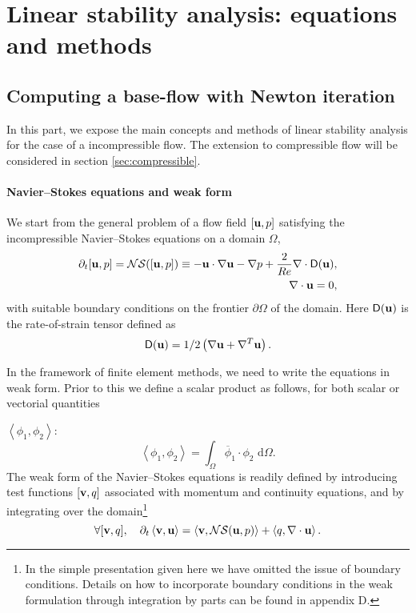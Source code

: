 \documentclass[twocolumn,10pt]{asme2ej}
\newcommand{\be}[1]{ \begin{equation} \label{#1}}
\newcommand{\ee}{\end{equation}}
\begin{document}

\section{Linear stability analysis: equations and methods}
\vspace{.2cm}


\subsection{Computing a base-flow with Newton iteration}
\vspace{.2cm}

In this part, we expose the main concepts and methods of linear stability analysis for the case of a incompressible flow.
The extension to compressible flow will be considered in section \ref{sec:compressible}.



\paragraph{Navier--Stokes equations and weak form}

We start from the general problem of a flow field $[{\bf u},p]$ satisfying the incompressible Navier--Stokes equations on a domain $\Omega$,
\begin{eqnarray} \label{NSprimitive}
\partial_t  [{\bf u},p] = {\cal NS} ( [{\bf u},p] )
\equiv - {\bf u} \cdot \nabla {\bf u} - \nabla p + \frac{2}{Re}  \nabla \cdot {\mathsf{D}}({\bf u}),  \\
\nabla \cdot {\bf u} = 0,
\end{eqnarray}
with suitable boundary conditions on the frontier $\partial \Omega$ of the domain.
Here $ {\mathsf{D}}({\bf u}) $ is the rate-of-strain tensor defined as
$$
 {\mathsf{D}}({\bf u}) = 1/2
\left( \nabla {\bf u} +  \nabla^T  {\bf u}\right).
$$ 

In the framework of finite element methods, we need to write the equations in weak form.
Prior to this we define a scalar product as follows, for both scalar or vectorial quantities 

$\left< \phi_1, \phi_2 \right> $:
$$
\left< \phi_1, \phi_2 \right> = \int_\Omega \overline{\phi}_1 \cdot \phi_2   \mbox{ d} \Omega.
$$
The weak form of the Navier--Stokes equations is readily defined by introducing test functions 
$[{\bf v},q]$ associated with momentum and continuity equations, and by integrating over the domain\footnote{In the simple presentation given here we have omitted the issue of boundary conditions. Details on how to incorporate boundary conditions in the weak formulation through integration by parts can be found in appendix D.}
\be{NSweak}
\forall [{\bf v},q], \quad \partial_t \left< {\bf v}, {\bf u}\right> = \left< {\bf v} , {\cal NS} ({\bf u},p) \right> + \left< q, \nabla \cdot {\bf u}\right>.
\ee
\end{document}

